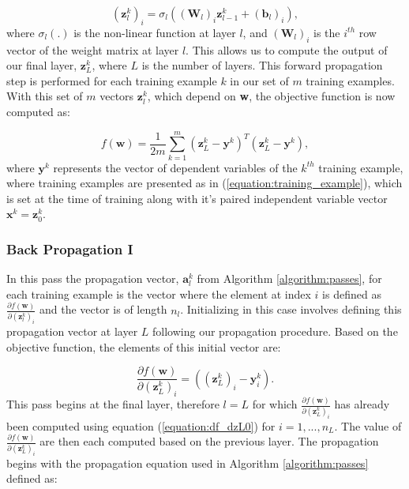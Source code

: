 \documentclass[letterpaper,12pt,titlepage,oneside,final]{book}
\begin{document}
	\begin{equation}
	(\mathbf{z}_{l}^{k})_{i} = \sigma_{l}((\mathbf{W}_{l})_{i}\mathbf{z}_{l-1}^{k} + (\mathbf{b}_{l})_{i}), 
	\label{equation:pass1_pe}
	\end{equation}
	where $\sigma_{l}(.)$ is the non-linear function at layer $l$, and $(\mathbf{W}_{l})_{i}$ is the $i^{th}$ row vector of the weight matrix at layer $l$. This allows us to compute the output of our final layer, $\mathbf{z}_{L}^{k}$, where $L$ is the number of layers. This forward propagation step is performed for each training example $k$ in our set of $m$ training examples. With this set of $m$ vectors $\mathbf{z}_{l}^{k}$, which depend on \textbf{w}, the objective function is now computed as:
	
	\begin{equation}
	f(\mathbf{w}) = \frac{1}{2m}\sum_{k=1}^{m}{(\mathbf{z}_{L}^{k} - \mathbf{y}^{k})^{T}(\mathbf{z}_{L}^{k} - \mathbf{y}^{k})},
	\end{equation}
	where $\mathbf{y}^k$ represents the vector of dependent variables of the $k^{th}$ training example, where training examples are presented as in (\ref{equation:training_example}), which is set at the time of training along with it's paired independent variable vector $\mathbf{x}^{k} = \mathbf{z}^{k}_{0}$.
	
	\subsubsection{Back Propagation I}
	
	In this pass the propagation vector, $\mathbf{a}^{k}_{l}$ from Algorithm \ref{algorithm:passes}, for each training example is the vector where the element at index $i$ is defined as  $\frac{\partial{f(\mathbf{w})}}{\partial{(\mathbf{z}^{k}_{l})_{i}}}$ and the vector is of length $n_{l}$. Initializing in this case involves defining this propagation vector at layer $L$ following our propagation procedure. Based on the objective function, the elements of this initial vector are:
	
	\begin{equation}
	\frac{\partial{f(\mathbf{w})}}{\partial{(\mathbf{z}^{k}_{L})_{i}}} = ((\mathbf{z}_{L}^{k})_{i} - \mathbf{y}^{k}_{i}).
	\label{equation:df_dzL0}
	\end{equation}
	This pass begins at the final layer, therefore $l = L$ for which $\frac{\partial{f(\mathbf{w})}}{\partial{(\mathbf{z}^{k}_{L})_{i}}}$ has already been computed using equation (\ref{equation:df_dzL0}) for $i=1,...,n_{L}$. The value of $\frac{\partial{f(\mathbf{w})}}{\partial{(\mathbf{z}^{k}_{L})_{i}}}$ are then each computed based on the previous layer. The propagation begins with the propagation equation used in Algorithm \ref{algorithm:passes} defined as:
	
\end{document}
